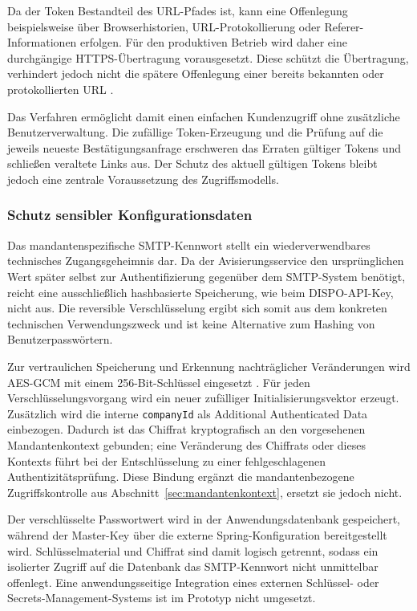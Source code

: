 Da der Token Bestandteil des URL-Pfades ist, kann eine Offenlegung
beispielsweise über Browserhistorien, URL-Protokollierung oder
Referer-Informationen erfolgen. Für den produktiven Betrieb wird daher eine
durchgängige HTTPS-Übertragung vorausgesetzt. Diese schützt die Übertragung,
verhindert jedoch nicht die spätere Offenlegung einer bereits bekannten oder
protokollierten URL \parencite{owaspInformationExposureUrls}.

Das Verfahren ermöglicht damit einen einfachen Kundenzugriff ohne zusätzliche
Benutzerverwaltung. Die zufällige Token-Erzeugung und die Prüfung auf die
jeweils neueste Bestätigungsanfrage erschweren das Erraten gültiger Tokens
und schließen veraltete Links aus. Der Schutz des aktuell gültigen Tokens
bleibt jedoch eine zentrale Voraussetzung des Zugriffsmodells.

\subsubsection{Schutz sensibler Konfigurationsdaten}
\label{sec:konfigurationsschutz}

Das mandantenspezifische SMTP-Kennwort stellt ein wiederverwendbares
technisches Zugangsgeheimnis dar. Da der Avisierungsservice den ursprünglichen
Wert später selbst zur Authentifizierung gegenüber dem SMTP-System benötigt,
reicht eine ausschließlich hashbasierte Speicherung, wie beim DISPO-API-Key,
nicht aus. Die reversible Verschlüsselung ergibt sich somit aus dem konkreten
technischen Verwendungszweck und ist keine Alternative zum Hashing von
Benutzerpasswörtern.

Zur vertraulichen Speicherung und Erkennung nachträglicher Veränderungen wird
AES-GCM mit einem 256-Bit-Schlüssel eingesetzt
\parencite{dworkin2007gcm,nist2023aes}. Für jeden Verschlüsselungsvorgang wird
ein neuer zufälliger
Initialisierungsvektor erzeugt. Zusätzlich wird die interne
\texttt{companyId} als Additional Authenticated Data einbezogen. Dadurch ist
das Chiffrat kryptografisch an den vorgesehenen Mandantenkontext gebunden; eine
Veränderung des Chiffrats oder dieses Kontexts führt bei der Entschlüsselung zu
einer fehlgeschlagenen Authentizitätsprüfung. Diese Bindung ergänzt die
mandantenbezogene Zugriffskontrolle aus
Abschnitt~\ref{sec:mandantenkontext}, ersetzt sie jedoch nicht.

Der verschlüsselte Passwortwert wird in der Anwendungsdatenbank gespeichert,
während der Master-Key über die externe Spring-Konfiguration bereitgestellt
wird. Schlüsselmaterial und Chiffrat sind damit logisch getrennt, sodass ein
isolierter Zugriff auf die Datenbank das SMTP-Kennwort nicht unmittelbar
offenlegt. Eine anwendungsseitige Integration eines externen Schlüssel- oder
Secrets-Management-Systems ist im Prototyp nicht umgesetzt.

